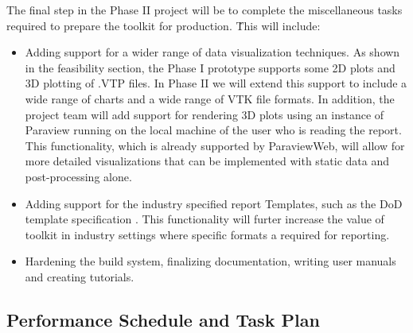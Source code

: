The final step in the Phase II project will be to complete the miscellaneous tasks required to prepare 
the toolkit for production. \. This will include:
\begin{itemize} 
 \item Adding support for a wider range of data visualization techniques. As shown in the feasibility section, the Phase I prototype supports some 2D plots and 3D plotting of .VTP files. In Phase II we will extend this support to include a wide range of charts and a wide range of VTK file formats. In addition, the project team will add support for rendering 3D plots using an instance of Paraview running on the local machine of the user who is reading the report. This functionality, which is already supported by ParaviewWeb, will allow for more detailed visualizations that can be implemented with static data and post-processing alone. 
 \item Adding support for the industry specified \VV report Templates, such as the DoD \VV template specification \cite{}. This functionality will furter increase the value of toolkit in industry settings where specific formats a required for \VV reporting. 
 \item Hardening the build system, finalizing documentation, writing user manuals and creating tutorials.
 

 \end{itemize}


\subsection{Performance Schedule and Task Plan}
\label{sec:taskplan}

